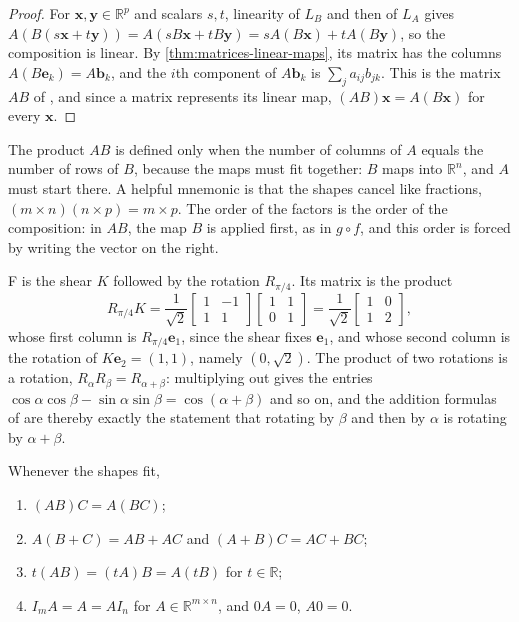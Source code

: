 \begin{proof}
For $\mathbf x,\mathbf y\in\mathbb R^p$ and scalars $s,t$, linearity of $L_B$ and then of $L_A$ gives $A(B(s\mathbf x+t\mathbf y))=A(sB\mathbf x+tB\mathbf y)=sA(B\mathbf x)+tA(B\mathbf y)$, so the composition is linear. By \cref{thm:matrices-linear-maps}, its matrix has the columns $A(B\mathbf e_k)=A\mathbf b_k$, and the $i$th component of $A\mathbf b_k$ is $\sum_ja_{ij}b_{jk}$. This is the matrix $AB$ of , and since a matrix represents its linear map, $(AB)\mathbf x=A(B\mathbf x)$ for every $\mathbf x$.
\end{proof}

The product $AB$ is defined only when the number of columns of $A$ equals the number of rows of $B$, because the maps must fit together: $B$ maps into $\mathbb R^n$, and $A$ must start there. A helpful mnemonic is that the shapes cancel like fractions, $(m\times n)(n\times p)=m\times p$. The order of the factors is the order of the composition: in $AB$, the map $B$ is applied first, as in $g\circ f$, and this order is forced by writing the vector on the right.

F is the shear $K$ followed by the rotation $R_{\pi/4}$. Its matrix is the product
\[
R_{\pi/4}K=\frac1{\sqrt2}\begin{bmatrix}1&-1\\1&1\end{bmatrix}\begin{bmatrix}1&1\\0&1\end{bmatrix}=\frac1{\sqrt2}\begin{bmatrix}1&0\\1&2\end{bmatrix},
\]
whose first column is $R_{\pi/4}\mathbf e_1$, since the shear fixes $\mathbf e_1$, and whose second column is the rotation of $K\mathbf e_2=(1,1)$, namely $(0,\sqrt2)$. The product of two rotations is a rotation, $R_\alpha R_\beta=R_{\alpha+\beta}$: multiplying out gives the entries $\cos\alpha\cos\beta-\sin\alpha\sin\beta=\cos(\alpha+\beta)$ and so on, and the addition formulas of  are thereby exactly the statement that rotating by $\beta$ and then by $\alpha$ is rotating by $\alpha+\beta$.

\begin{theorem}
\label{thm:product-rules}
Whenever the shapes fit,
\begin{enumerate}
\item $(AB)C=A(BC)$;
\item $A(B+C)=AB+AC$ and $(A+B)C=AC+BC$;
\item $t(AB)=(tA)B=A(tB)$ for $t\in\mathbb R$;
\item $I_mA=A=AI_n$ for $A\in\mathbb R^{m\times n}$, and $0A=0$, $A0=0$.
\end{enumerate}
\end{theorem}

